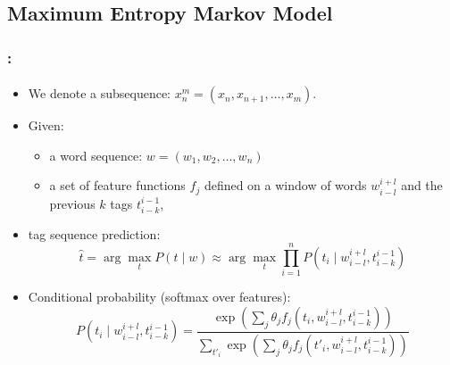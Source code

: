 \documentclass[xcolor=table]{beamer}
\begin{document}
%	
%	

\subsection{Maximum Entropy Markov Model}

\begin{frame}
	\frametitle{\insertshortsubtitle: \insertsection}
	\framesubtitle{\insertsubsection}

	\begin{itemize}
		\item We denote a subsequence: $x_n^m = (x_n, x_{n+1}, \ldots, x_m)$.
		\item Given:
		\begin{itemize}
			\item a word sequence: $w = (w_1, w_2, \ldots, w_n)$
			\item a set of feature functions $f_j$ defined on a window of words $w_{i-l}^{i+l}$ and the previous $k$ tags $t_{i-k}^{i-1}$,
		\end{itemize}
		\item tag sequence prediction:
		\[
		\hat{t} = \arg\max_{t} P(t \mid w) \approx \arg\max_{t} \prod_{i=1}^{n} P(t_i \mid w_{i-l}^{i+l}, t_{i-k}^{i-1})
		\]
		\item Conditional probability (softmax over features):
		\[
		P(t_i \mid w_{i-l}^{i+l}, t_{i-k}^{i-1}) =
		\frac{\exp\left(\sum_j \theta_j f_j(t_i, w_{i-l}^{i+l}, t_{i-k}^{i-1})\right)}
		{\sum_{t'_i} \exp\left(\sum_j \theta_j f_j(t'_i, w_{i-l}^{i+l}, t_{i-k}^{i-1})\right)}
		\]
	\end{itemize}

\end{frame}
\end{document}
